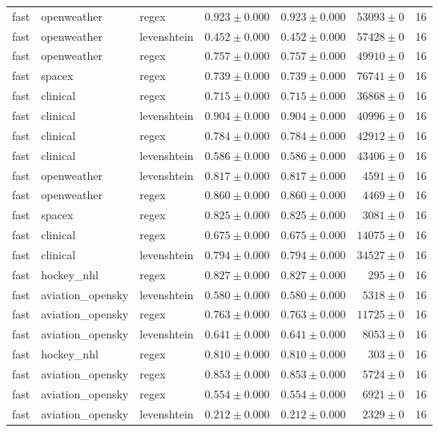 \begin{table}[htbp]
\begin{tabular}{l l l r r r r}
fast & openweather & regex & $0.923\pm0.000$ & $0.923\pm0.000$ & $53093\pm0$ & 16 \\
fast & openweather & levenshtein & $0.452\pm0.000$ & $0.452\pm0.000$ & $57428\pm0$ & 16 \\
fast & openweather & regex & $0.757\pm0.000$ & $0.757\pm0.000$ & $49910\pm0$ & 16 \\
fast & spacex & regex & $0.739\pm0.000$ & $0.739\pm0.000$ & $76741\pm0$ & 16 \\
fast & clinical & regex & $0.715\pm0.000$ & $0.715\pm0.000$ & $36868\pm0$ & 16 \\
fast & clinical & levenshtein & $0.904\pm0.000$ & $0.904\pm0.000$ & $40996\pm0$ & 16 \\
fast & clinical & regex & $0.784\pm0.000$ & $0.784\pm0.000$ & $42912\pm0$ & 16 \\
fast & clinical & levenshtein & $0.586\pm0.000$ & $0.586\pm0.000$ & $43406\pm0$ & 16 \\
fast & openweather & levenshtein & $0.817\pm0.000$ & $0.817\pm0.000$ & $4591\pm0$ & 16 \\
fast & openweather & regex & $0.860\pm0.000$ & $0.860\pm0.000$ & $4469\pm0$ & 16 \\
fast & spacex & regex & $0.825\pm0.000$ & $0.825\pm0.000$ & $3081\pm0$ & 16 \\
fast & clinical & regex & $0.675\pm0.000$ & $0.675\pm0.000$ & $14075\pm0$ & 16 \\
fast & clinical & levenshtein & $0.794\pm0.000$ & $0.794\pm0.000$ & $34527\pm0$ & 16 \\
fast & hockey\_nhl & regex & $0.827\pm0.000$ & $0.827\pm0.000$ & $295\pm0$ & 16 \\
fast & aviation\_opensky & levenshtein & $0.580\pm0.000$ & $0.580\pm0.000$ & $5318\pm0$ & 16 \\
fast & aviation\_opensky & regex & $0.763\pm0.000$ & $0.763\pm0.000$ & $11725\pm0$ & 16 \\
fast & aviation\_opensky & levenshtein & $0.641\pm0.000$ & $0.641\pm0.000$ & $8053\pm0$ & 16 \\
fast & hockey\_nhl & regex & $0.810\pm0.000$ & $0.810\pm0.000$ & $303\pm0$ & 16 \\
fast & aviation\_opensky & regex & $0.853\pm0.000$ & $0.853\pm0.000$ & $5724\pm0$ & 16 \\
fast & aviation\_opensky & regex & $0.554\pm0.000$ & $0.554\pm0.000$ & $6921\pm0$ & 16 \\
fast & aviation\_opensky & levenshtein & $0.212\pm0.000$ & $0.212\pm0.000$ & $2329\pm0$ & 16 \\

\end{tabular}
\end{table}
